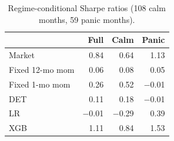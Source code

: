 \begin{table}[H]
\centering
\begin{tabular}{l r r r}
\toprule
 & Full & Calm & Panic \\
\midrule
Market & 0.84 & 0.64 & 1.13 \\
\midrule
Fixed 12-mo mom & 0.06 & 0.08 & 0.05 \\
Fixed 1-mo mom & 0.26 & 0.52 & $-$0.01 \\
DET & 0.11 & 0.18 & $-$0.01 \\
LR & $-$0.01 & $-$0.29 & 0.39 \\
XGB & 1.11 & 0.84 & 1.53 \\
\bottomrule
\end{tabular}
\caption{Regime-conditional Sharpe ratios (108 calm months, 59 panic months).}
\label{tab:regime_sharpe}
\end{table}
